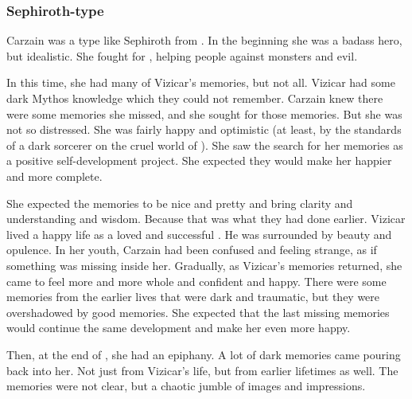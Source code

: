 \subsubsection{Sephiroth-type}
Carzain was a type like Sephiroth from \cite{VideoGame:FinalFantasyVII}. 
In the beginning she was a badass hero, but idealistic.
She fought for , helping people against monsters and evil. 

In this time, she had many of Vizicar's memories, but not all. 
Vizicar had some dark Mythos knowledge which they could not remember. 
Carzain knew there were some memories she missed, and she sought for those memories. 
But she was not so distressed. 
She was fairly happy and optimistic (at least, by the standards of a dark sorcerer on the cruel world of \Miith). 
She saw the search for her memories as a positive self-development project. 
She expected they would make her happier and more complete. 

She expected the memories to be nice and pretty and bring clarity and understanding and wisdom. 
Because that was what they had done earlier. 
Vizicar lived a happy life as a loved and successful \caliph. 
He was surrounded by beauty and opulence. 
In her youth, Carzain had been confused and feeling strange, as if something was missing inside her.
Gradually, as Vizicar's memories returned, she came to feel more and more whole and confident and happy. 
There were some memories from the earlier lives that were dark and traumatic, but they were overshadowed by good memories. 
She expected that the last missing memories would continue the same development and make her even more happy. 

Then, at the end of \TwilightAngelRememberEmph, she had an epiphany. 
A lot of dark memories came pouring back into her. 
Not just from Vizicar's life, but from earlier lifetimes as well. 
The memories were not clear, but a chaotic jumble of images and impressions. 

